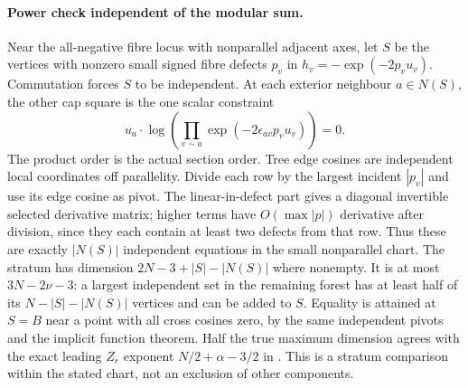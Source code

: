 \paragraph{Power check independent of the modular sum.}
Near the all-negative fibre locus with nonparallel adjacent axes, let \(S\) be the vertices with nonzero small signed fibre defects \(p_v\) in \(h_v=-\exp(-2p_vu_v)\). Commutation forces \(S\) to be independent. At each exterior neighbour \(a\in N(S)\), the other cap square is the one scalar constraint
\[
 u_a\cdot\log\!\left(\prod_{v\sim a}\exp(-2\epsilon_{av}p_vu_v)\right)=0 .
\]
The product order is the actual section order. Tree edge cosines are independent local coordinates off parallelity. Divide each row by the largest incident \(|p_v|\) and use its edge cosine as pivot. The linear-in-defect part gives a diagonal invertible selected derivative matrix; higher terms have \(O(\max|p|)\) derivative after division, since they each contain at least two defects from that row. Thus these are exactly \(|N(S)|\) independent equations in the small nonparallel chart. The stratum has dimension \(2N-3+|S|-|N(S)|\) where nonempty. It is at most \(3N-2\nu-3\): a largest independent set in the remaining forest has at least half of its \(N-|S|-|N(S)|\) vertices and can be added to \(S\). Equality is attained at \(S=B\) near a point with all cross cosines zero, by the same independent pivots and the implicit function theorem. Half the true maximum dimension agrees with the exact leading \(Z_r\) exponent \(N/2+\alpha-3/2\) in \cite{P48}. This is a stratum comparison within the stated chart, not an exclusion of other components.
